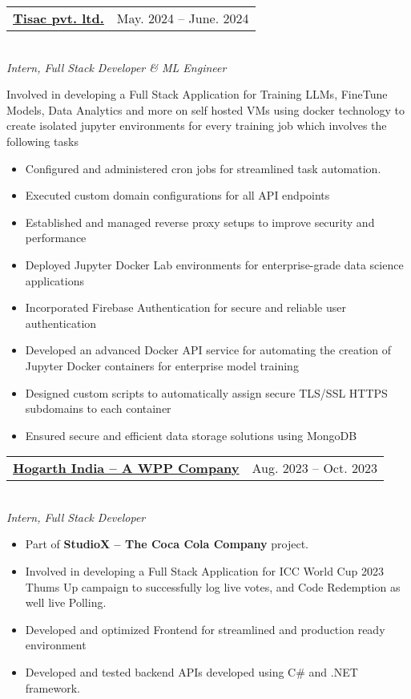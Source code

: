\documentclass[letter paper, 15pt]{article}
\makeatletter
\newcommand{\resumeProjectHeading}[2]{
    \item
    \begin{tabular*}{0.97\textwidth}{l@{\extracolsep{\fill}}r}
      \small#1 & #2 \\
    \end{tabular*}\vspace{-7pt}
}
\makeatother
\begin{document}
            \resumeProjectHeading
          {\textbf{\underline{Tisac pvt. ltd.}}}{May. 2024 -- June. 2024} \\ \vspace{9pt}
          {\small{\emph{Intern, Full Stack Developer \& ML Engineer}}} \\
          {\footnotesize{Involved in developing a Full Stack Application for Training LLMs, FineTune Models, Data Analytics and more on self hosted VMs using docker technology to create isolated jupyter environments for every training job which involves the following tasks
            \begin{itemize}
                \item Configured and administered cron jobs for streamlined task automation.
                \item Executed custom domain configurations for all API endpoints
                \item Established and managed reverse proxy setups to improve security and performance
                \item Deployed Jupyter Docker Lab environments for enterprise-grade data science applications
                \item Incorporated Firebase Authentication for secure and reliable user authentication
                \item Developed an advanced Docker API service for automating the creation of Jupyter Docker containers for enterprise model training
                \item Designed custom scripts to automatically assign secure TLS/SSL HTTPS subdomains to each container
                \item Ensured secure and efficient data storage solutions using MongoDB
            \end{itemize}
        }}

          \resumeProjectHeading
          {\textbf{\underline{Hogarth India – A WPP Company}}}{Aug. 2023 -- Oct. 2023} \\ \vspace{9pt}
          {\small{\emph{Intern, Full Stack Developer}}} \\
          {\footnotesize{
            \begin{itemize}
                \item Part of \textbf{StudioX – The Coca Cola Company} project.
                \item Involved in developing a Full Stack Application for ICC World Cup 2023 Thums Up campaign to successfully log live votes, and Code Redemption as well live Polling.
                \item Developed and optimized Frontend for streamlined and production ready environment
                \item Developed and tested backend APIs developed using C\# and .NET framework.
            \end{itemize}
          }}
\end{document}
